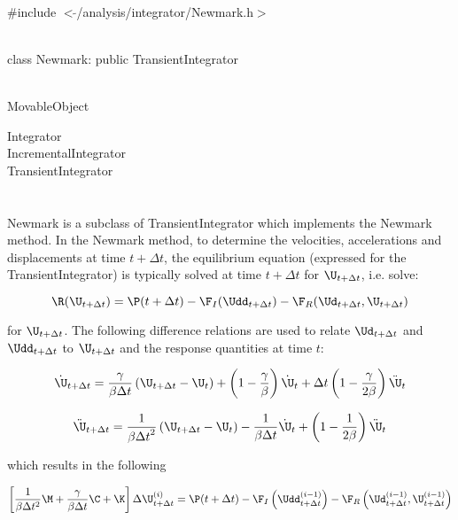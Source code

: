 
   \\
\#include $<\tilde{ }$/analysis/integrator/Newmark.h$>$  


  \\
class Newmark: public TransientIntegrator  


 \\
MovableObject 

\indent\indent Integrator \\
\indent\indent\indent IncrementalIntegrator \\
\indent\indent\indent\indent TransientIntegrator \\
\indent\indent\indent\indent{} \\

 \\ 
\indent Newmark is a subclass of TransientIntegrator which implements
the Newmark method. In the Newmark method, to determine the
velocities, accelerations and displacements at time $t + \Delta t$,
the equilibrium equation (expressed for the TransientIntegrator) is
typically solved at time $t + \Delta t$ for $\U_{t+\Delta t}$,
i.e. solve: 

$$ \R (\U_{t + \Delta t}) = \P(t + \Delta t) - \F_I(\Udd_{t+\Delta t})
- \F_R(\Ud_{t + \Delta t},\U_{t + \Delta t}) $$


\noindent for $\U_{t+\Delta t}$. The following difference relations
are used to relate $\Ud_{t + \Delta t}$ and $\Udd_{t + \Delta t}$ to
$\U_{t + \Delta t}$ and the response quantities at time $t$:

$$
\dot \U_{t + \Delta t} = \frac{\gamma}{\beta \Delta t}
\left( \U_{t + \Delta t} - \U_t \right)
 + \left( 1 - \frac{\gamma}{\beta}\right) \dot \U_t + \Delta t \left(1
- \frac{\gamma}{2 \beta}\right) \ddot \U_t 
$$


$$
\ddot \U_{t + \Delta t} = \frac{1}{\beta {\Delta t}^2}
\left( \U_{t+\Delta t} - \U_t \right)
 - \frac{1}{\beta \Delta t} \dot \U_t + \left( 1 - \frac{1}{2
\beta} \right) \ddot \U_t 
$$


\noindent which  results in the following 

$$ \left[ \frac{1}{\beta \Delta t^2} \M + \frac{\gamma}{\beta \Delta t}
\C + \K \right] \Delta \U_{t + \Delta t}^{(i)} = \P(t + \Delta t) -
\F_I\left(\Udd_{t+\Delta  t}^{(i-1)}\right)
- \F_R\left(\Ud_{t + \Delta t}^{(i-1)},\U_{t + \Delta t}^{(i-1)}\right) $$



